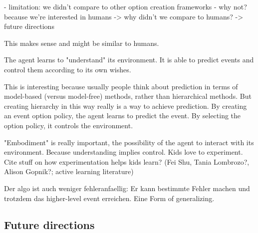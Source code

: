 \documentclass{article}
\begin{document}
- limitation: we didn't compare to other option creation frameworks
- why not? because we're interested in humans -> why didn't we compare to humans? -> future directions

This makes sense and might be similar to humans.

The agent learns to "understand" its environment. It is able to predict events and control them according to its own wishes.

This is interesting because usually people think about prediction in terms of model-based (versus model-free) methods, rather than hierarchical methods. But creating hierarchy in this way really is a way to achieve prediction. By creating an event option policy, the agent learns to predict the event. By selecting the option policy, it controls the environment.

"Embodiment" is really important, the possibility of the agent to interact with its environment. Because understanding implies control. Kids love to experiment. Cite stuff on how experimentation helps kids learn? (Fei Shu, Tania Lombrozo?, Alison Gopnik?; active learning literature)

Der algo ist auch weniger fehleranfaellig: Er kann bestimmte Fehler machen und trotzdem das higher-level event erreichen. Eine Form of generalizing.



\subsection{Future directions}
\end{document}
